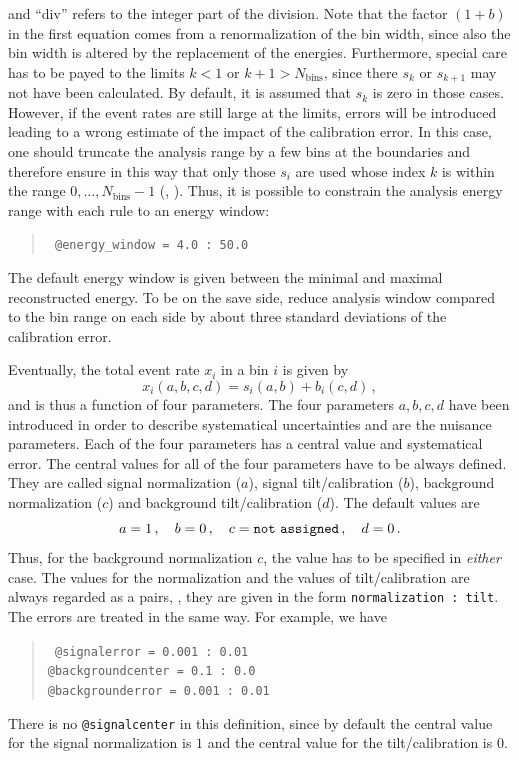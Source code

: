 and ``div'' refers to the integer part of the division. Note that the
factor $(1+b)$ in the first equation comes from a renormalization of
the bin width, since also the bin width is altered by the replacement of
the energies. Furthermore, special care has to be payed to the limits
 $k<1$ or $k+1>N_\mathrm{bins}$, since there $s_k$ or $s_{k+1}$ may not have been calculated. By default, it is assumed that $s_k$ is
zero in those cases. However, if the event rates are still large at
the limits, errors will be introduced leading to a wrong
estimate of the impact of the calibration error. In this case,
one should truncate the analysis range by a few bins at the boundaries
and therefore ensure in this way that only those $s_i$ are used whose index
$k$ is within the range $0,\ldots, N_\mathrm{bins}-1$ (\cf, ). 
Thus, it is possible to constrain the analysis energy range 
with each rule to an energy window:
\begin{quote}
{\tt 
\tb @energy\_window = 4.0 : 50.0 
}
\end{quote}
The default energy window is given between the minimal and maximal reconstructed energy. To be on the save side, reduce analysis window
compared to the bin range on each side by about three standard deviations 
of the calibration error.

Eventually, the total event rate $x_i$ in a bin $i$ is given by
\begin{equation}
x_i(a,b,c,d)=s_i(a,b)+b_i(c,d) \, ,
\end{equation}
and is thus a function of four parameters. 
The four parameters $a,b,c,d$ have been introduced in order to describe
systematical uncertainties and are the nuisance parameters.
Each of the four parameters has a central value and systematical error.
The central values for all of
the four parameters have to be always defined. They are called 
signal normalization ($a$), signal tilt/calibration ($b$), 
background  normalization ($c$) and
background tilt/calibration ($d$). The default values are
\begin{equation}
a=1\,,\quad b=0\,,\quad c={\tt not \, \, assigned}\,,\quad d=0\,.
\end{equation}
Thus, for the background normalization $c$, the value has to be specified 
in \emph{either} case. The values for the normalization and the 
values of tilt/calibration are always regarded
as a pairs, \ie, they are given in the form {\tt normalization : tilt}. The errors are treated in the same way. For example, we have
\begin{quote}
{\tt
\tb @signalerror =       0.001  :       0.01\\
\tb @backgroundcenter =  0.1 :       0.0\\
\tb @backgrounderror =   0.001 :       0.01
}
\end{quote}
There is no {\tt @signalcenter} in this definition, 
since by default the central value for the
signal normalization is $1$ and the central value for the tilt/calibration 
is $0$.  


